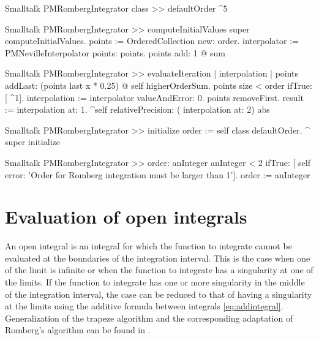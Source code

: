 \begin{displaycode}{Smalltalk}
PMRombergIntegrator class >> defaultOrder
    ^5
\end{displaycode}

\begin{displaycode}{Smalltalk}
PMRombergIntegrator >> computeInitialValues
    super computeInitialValues.
    points := OrderedCollection new: order.
    interpolator := PMNevilleInterpolator points: points.
    points add: 1 @ sum
\end{displaycode}

\begin{displaycode}{Smalltalk}
PMRombergIntegrator >> evaluateIteration
    | interpolation |
    points addLast: (points last x * 0.25) @ self higherOrderSum.
    points size < order
        ifTrue: [ ^1].
    interpolation := interpolator valueAndError: 0.
    points removeFirst.
    result := interpolation at: 1.
    ^self relativePrecision: ( interpolation at: 2) abs
\end{displaycode}

\begin{displaycode}{Smalltalk}
PMRombergIntegrator >> initialize
    order := self class defaultOrder.
    ^ super initialize
\end{displaycode}

\begin{displaycode}{Smalltalk}
PMRombergIntegrator >> order: anInteger
    anInteger < 2
        ifTrue: [
           self error: 'Order for Romberg integration must be 
                                                larger than 1'].
    order := anInteger
\end{displaycode}

\section{Evaluation of open integrals}
An open integral is an integral for which the function to
integrate cannot be evaluated at the boundaries of the integration
interval. This is the case when one of the limit is infinite or
when the function to integrate has a singularity at one of the
limits. If the function to integrate has one or more singularity
in the middle of the integration interval, the case can be reduced
to that of having a singularity at the limits using the additive
formula between integrals \ref{eq:addintegral}. Generalization of
the trapeze algorithm and the corresponding adaptation of
Romberg's algorithm can be found in \cite{Press}.

